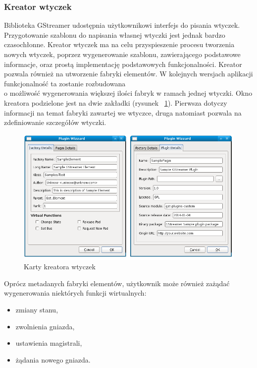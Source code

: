 \documentclass[12pt]{article}
\begin{document}
\subsubsection{Kreator wtyczek}
Biblioteka GStreamer udostępnia użytkownikowi interfejs do pisania wtyczek. Przygotowanie szablonu do napisania własnej wtyczki jest jednak bardzo czasochłonne. Kreator wtyczek ma na celu przyspieszenie procesu tworzenia nowych wtyczek, poprzez wygenerowanie szablonu, zawierającego podstawowe informacje, oraz prostą implementację podstawowych funkcjonalności.
Kreator pozwala również na utworzenie fabryki elementów. W kolejnych wersjach aplikacji funkcjonalność ta zostanie rozbudowana \\o możliwość wygenerowania większej ilości fabryk w ramach jednej wtyczki.
Okno kreatora podzielone jest na dwie zakładki (rysunek ~\ref{fig:pluginWizzard}). Pierwsza dotyczy informacji na temat fabryki zawartej we wtyczce, druga natomiast pozwala na zdefiniowanie szczegółów wtyczki.
\begin{figure}[H]
  \includegraphics[width=155mm]{img/plugin-wizzard.png}
  \caption{Karty kreatora wtyczek}
  \label{fig:pluginWizzard}
\end{figure}

\noindent
Oprócz metadanych fabryki elementów, użytkownik może również zażądać wygenerowania niektórych funkcji wirtualnych:
\begin{itemize}
  \setlength{\itemsep}{0em}
\item zmiany stanu,
\item zwolnienia gniazda,
\item ustawienia magistrali,
\item żądania nowego gniazda.
\end{itemize}
\end{document}
